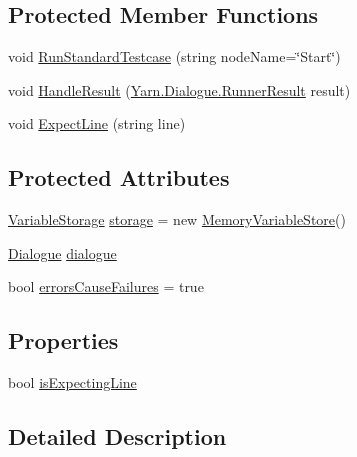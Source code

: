 \subsection*{Protected Member Functions}
\begin{DoxyCompactItemize}
\item 
void \hyperlink{a00144_abffa134d40d72b21e6b35c3bf05fc53f}{Run\-Standard\-Testcase} (string node\-Name=\char`\"{}Start\char`\"{})
\item 
void \hyperlink{a00144_a7b525f85a26d7c942e1cbfa5d6453893}{Handle\-Result} (\hyperlink{a00130}{Yarn.\-Dialogue.\-Runner\-Result} result)
\item 
void \hyperlink{a00144_ac21a5082ddac1da9db17ae54038df44e}{Expect\-Line} (string line)
\end{DoxyCompactItemize}
\subsection*{Protected Attributes}
\begin{DoxyCompactItemize}
\item 
\hyperlink{a00164}{Variable\-Storage} \hyperlink{a00144_a23d59ace1516ca72924c6fe3feafd3f7}{storage} = new \hyperlink{a00108}{Memory\-Variable\-Store}()
\item 
\hyperlink{a00070}{Dialogue} \hyperlink{a00144_a4cff5de56c4b8a91c76b6eb2d622a795}{dialogue}
\item 
bool \hyperlink{a00144_ac978fe85db843c51411f5517bdbe0eb8}{errors\-Cause\-Failures} = true
\end{DoxyCompactItemize}
\subsection*{Properties}
\begin{DoxyCompactItemize}
\item 
bool \hyperlink{a00144_a47f35b8e8123ed9471883d02b8bc9f3e}{is\-Expecting\-Line}
\end{DoxyCompactItemize}


\subsection{Detailed Description}


